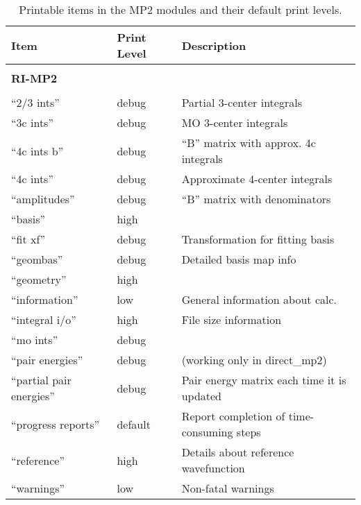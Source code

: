 \begin{table}
\caption{Printable items in the MP2 modules and their default print levels.}
\label{tbl:mp2-printable}
\begin{tabular}{lll}
\hline\hline
Item                    & Print Level   & Description \\
\hline

        & & \\ 
{\bf RI-MP2}  & & \\ \hline
        & & \\ 
``2/3 ints''              & debug         & Partial 3-center integrals \\
``3c ints''               & debug         & MO 3-center integrals  \\
``4c ints b''             & debug         & ``B'' matrix with approx. 4c integrals \\
``4c ints''               & debug         & Approximate 4-center integrals \\
``amplitudes''            & debug         & ``B'' matrix with denominators \\
``basis''                 & high          & \\
``fit xf''                & debug         & Transformation for fitting basis \\
``geombas''               & debug         & Detailed basis map info\\
``geometry''              & high          & \\
``information''           & low           & General information about calc.\\
``integral i/o''          & high          & File size information\\
``mo ints''               & debug         & \\
``pair energies''         & debug         & (working only in direct\_mp2) \\
``partial pair energies'' & debug         & Pair energy matrix each time it is updated \\
``progress reports''      & default       & Report completion of time-consuming steps\\
``reference''             & high          & Details about reference wavefunction\\
``warnings''              & low           & Non-fatal warnings \\
\hline\hline
\end{tabular}
\end{table}

